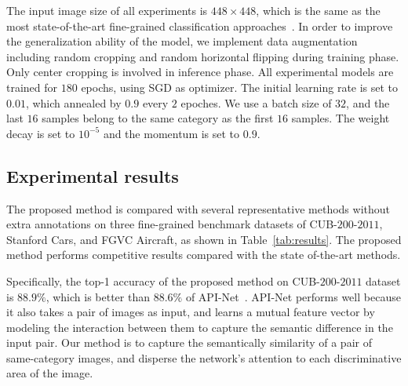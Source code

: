 \documentclass[conference]{IEEEtran}
\begin{document}
The input image size of all experiments is $448 \times 448$, which is the same as the most state-of-the-art fine-grained classification approaches~\cite{wang2018learning,yang2018learning,Zheng_2019_CVPR,sun2018multi,2020CIN}. In order to improve the generalization ability of the model, we implement data augmentation including random cropping and random horizontal flipping during training phase. Only center cropping is involved in inference phase. All experimental models are trained for $180$ epochs, using SGD as optimizer. The initial learning rate is set to $0.01$, which annealed by $0.9$ every $2$ epoches. We use a batch size of $32$, and the last $16$ samples belong to the same category as the first $16$ samples. The weight decay is set to $10^{-5}$ and the momentum is set to $0.9$.

\subsection{Experimental results}
The proposed method is compared with several representative methods without extra annotations on three fine-grained benchmark datasets of CUB-$200$-$2011$, Stanford Cars, and FGVC Aircraft, as shown in Table~\ref{tab:results}. The proposed method performs competitive results compared with the state of-the-art methods.

Specifically, the top-1 accuracy of the proposed method on CUB-$200$-$2011$ dataset is $88.9\%$, which is better than $88.6\%$ of API-Net~\cite{zhuang2020learning}. API-Net performs well because it also takes a pair of images as input, and learns a mutual feature vector by modeling the interaction between them to capture the semantic difference in the input pair. Our method is to capture the semantically similarity of a pair of same-category images, and disperse the network's attention to each discriminative area of the image.
\end{document}
